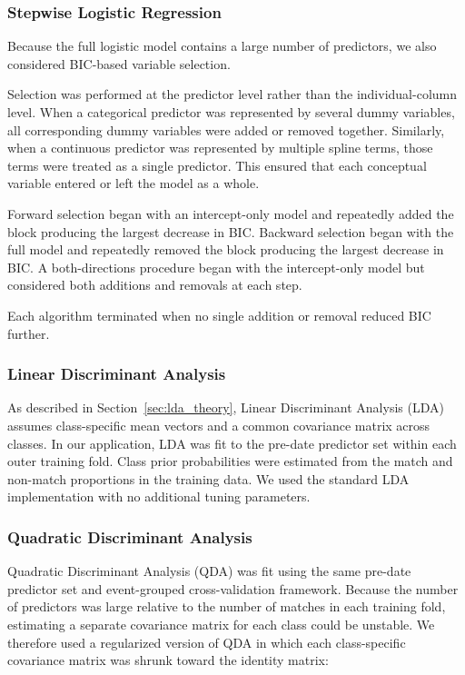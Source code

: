 \documentclass[11pt,letterpaper,reqno]{amsart}
\numberwithin{equation}{subsection}
\theoremstyle{definition}
\numberwithin{thm}{subsection}
\begin{document}
\subsubsection{Stepwise Logistic Regression}

Because the full logistic model contains a large number of predictors, we also considered BIC-based variable selection.

Selection was performed at the predictor level rather than the individual-column level. When a categorical predictor was represented by several dummy variables, all corresponding dummy variables were added or removed together. Similarly, when a continuous predictor was represented by multiple spline terms, those terms were treated as a single predictor. This ensured that each conceptual variable entered or left the model as a whole.

Forward selection began with an intercept-only model and repeatedly added the block producing the largest decrease in BIC. Backward selection began with the full model and repeatedly removed the block producing the largest decrease in BIC. A both-directions procedure began with the intercept-only model but considered both additions and removals at each step.

Each algorithm terminated when no single addition or removal reduced BIC further.

\subsubsection{Linear Discriminant Analysis}

As described in Section~\ref{sec:lda_theory}, Linear Discriminant Analysis (LDA) assumes class-specific mean vectors and a common covariance matrix across classes. In our application, LDA was fit to the pre-date predictor set within each outer training fold. Class prior probabilities were estimated from the match and non-match proportions in the training data. We used the standard LDA implementation with no additional tuning parameters.

\subsubsection{Quadratic Discriminant Analysis}

Quadratic Discriminant Analysis (QDA) was fit using the same pre-date predictor set and event-grouped cross-validation framework. Because the number of predictors was large relative to the number of matches in each training fold, estimating a separate covariance matrix for each class could be unstable. We therefore used a regularized version of QDA in which each class-specific covariance matrix was shrunk toward the identity matrix:
\end{document}
